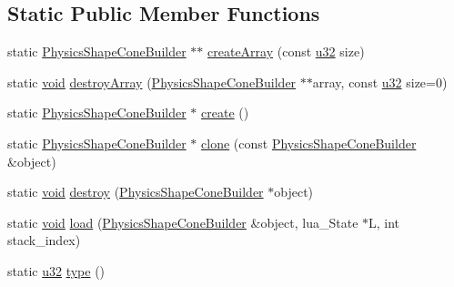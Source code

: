 \subsection*{Static Public Member Functions}
\begin{DoxyCompactItemize}
\item 
static \mbox{\hyperlink{classnjli_1_1_physics_shape_cone_builder}{Physics\+Shape\+Cone\+Builder}} $\ast$$\ast$ \mbox{\hyperlink{classnjli_1_1_physics_shape_cone_builder_ad52483797ddcb3189e2d28b386a22614}{create\+Array}} (const \mbox{\hyperlink{_util_8h_a10e94b422ef0c20dcdec20d31a1f5049}{u32}} size)
\item 
static \mbox{\hyperlink{_thread_8h_af1e856da2e658414cb2456cb6f7ebc66}{void}} \mbox{\hyperlink{classnjli_1_1_physics_shape_cone_builder_a90298bcea1676d8c3655e7b0cf243555}{destroy\+Array}} (\mbox{\hyperlink{classnjli_1_1_physics_shape_cone_builder}{Physics\+Shape\+Cone\+Builder}} $\ast$$\ast$array, const \mbox{\hyperlink{_util_8h_a10e94b422ef0c20dcdec20d31a1f5049}{u32}} size=0)
\item 
static \mbox{\hyperlink{classnjli_1_1_physics_shape_cone_builder}{Physics\+Shape\+Cone\+Builder}} $\ast$ \mbox{\hyperlink{classnjli_1_1_physics_shape_cone_builder_ae90e688c959bed817ee008755f7f8284}{create}} ()
\item 
static \mbox{\hyperlink{classnjli_1_1_physics_shape_cone_builder}{Physics\+Shape\+Cone\+Builder}} $\ast$ \mbox{\hyperlink{classnjli_1_1_physics_shape_cone_builder_a740146e491d77b354a8ba7c0bbcec109}{clone}} (const \mbox{\hyperlink{classnjli_1_1_physics_shape_cone_builder}{Physics\+Shape\+Cone\+Builder}} \&object)
\item 
static \mbox{\hyperlink{_thread_8h_af1e856da2e658414cb2456cb6f7ebc66}{void}} \mbox{\hyperlink{classnjli_1_1_physics_shape_cone_builder_a4257de7ae7743d0bf8a537b1c2c1c28b}{destroy}} (\mbox{\hyperlink{classnjli_1_1_physics_shape_cone_builder}{Physics\+Shape\+Cone\+Builder}} $\ast$object)
\item 
static \mbox{\hyperlink{_thread_8h_af1e856da2e658414cb2456cb6f7ebc66}{void}} \mbox{\hyperlink{classnjli_1_1_physics_shape_cone_builder_a2c5f053be527c492b5c54f50c43eb255}{load}} (\mbox{\hyperlink{classnjli_1_1_physics_shape_cone_builder}{Physics\+Shape\+Cone\+Builder}} \&object, lua\+\_\+\+State $\ast$L, int stack\+\_\+index)
\item 
static \mbox{\hyperlink{_util_8h_a10e94b422ef0c20dcdec20d31a1f5049}{u32}} \mbox{\hyperlink{classnjli_1_1_physics_shape_cone_builder_a79efe7234069d916c0d743b7037abcfe}{type}} ()
\end{DoxyCompactItemize}
